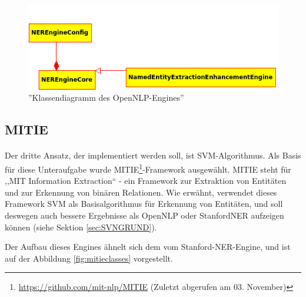 \begin{figure}[ht]
\centering
\includegraphics[width=\textwidth]{Bilder/onlp-classes.png}
\caption{''Klassendiagramm des OpenNLP-Engines''}
\label{fig:onlpuml}
\end{figure}

\subsection{MITIE}
\paragraph{}
Der dritte Ansatz, der implementiert werden soll, ist SVM-Algorithmus. Als Basis für diese Unteraufgabe wurde MITIE\footnote{\url{https://github.com/mit-nlp/MITIE} (Zuletzt abgerufen am 03. November)}-Framework ausgewählt. MITIE steht für ,,MIT Information Extraction`` - ein Framework zur Extraktion von Entitäten und zur Erkennung von binären Relationen. Wie erwähnt, verwendet dieses Framework SVM als Basisalgorithmus für Erkennung von Entitäten, und soll deswegen auch bessere Ergebnisse als OpenNLP oder StanfordNER aufzeigen können (siehe Sektion \ref{sec:SVNGRUND}).

Der Aufbau dieses Engines ähnelt sich dem vom Stanford-NER-Engine, und ist auf der Abbildung \ref{fig:mitieclasses} vorgestellt.


